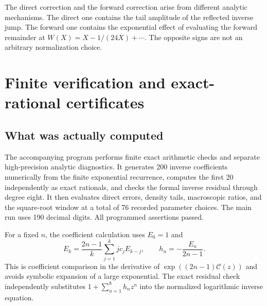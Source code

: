 \documentclass[11pt,a4paper]{article}
\theoremstyle{definition}
\numberwithin{equation}{section}
\newcommand{\ee}{\mathrm{e}}
\newcommand{\cformal}{\mathscr C}
\begin{document}
The direct correction and the forward correction arise from different
analytic mechanisms. The direct one contains the tail amplitude of the
reflected inverse jump. The forward one contains the exponential effect
of evaluating the forward remainder at $W(X)=X-1/(24X)+\cdots$.
The opposite signs are not an arbitrary normalization choice.

\section{Finite verification and exact-rational certificates}
\label{sec:verification}

\subsection{What was actually computed}
The accompanying program  performs finite
exact arithmetic checks and separate high-precision analytic diagnostics.
It generates 200 inverse coefficients numerically from the finite
exponential recurrence, computes the first 20 independently as exact
rationals, and checks the formal inverse residual through degree eight.
It then evaluates direct errors, density tails, macroscopic ratios, and
the square-root window at a total of 76 recorded parameter choices.
The main run uses 190 decimal digits. All programmed assertions passed.

For a fixed $n$, the coefficient calculation uses $E_0=1$ and
\begin{equation}
 E_k=\frac{2n-1}{k}\sum_{j=1}^k j c_j E_{k-j},\qquad
 h_n=-\frac{E_n}{2n-1}.
 \label{eq:recurrence}
\end{equation}
This is coefficient comparison in the derivative of
$\exp((2n-1)\cformal(z))$ and avoids symbolic expansion of a large
exponential. The exact residual check independently substitutes
$1+\sum_{n=1}^8h_nz^n$ into the normalized logarithmic inverse equation.

\begin{table}[tbp]
\centering\small

\caption{Numerical optimal-scale checks at $N=\lfloor\pi X\rfloor$.
The normalized error is $(-1)^N(S_N-W)/(\sqrt X\ee^{-2\pi X})$.
The next column is $1+B_1^-(\sigma)/X+B_2^-(\sigma)/X^2$.
The last column is
$(-1)^{N+1}(S_N-u_N)/(\pi X^{-1/2}\ee^{-2\pi X}/6)$ and tends to one.
Displayed decimals are rounded diagnostics, not interval endpoints.}
\label{tab:numeric}
\end{table}
\end{document}
